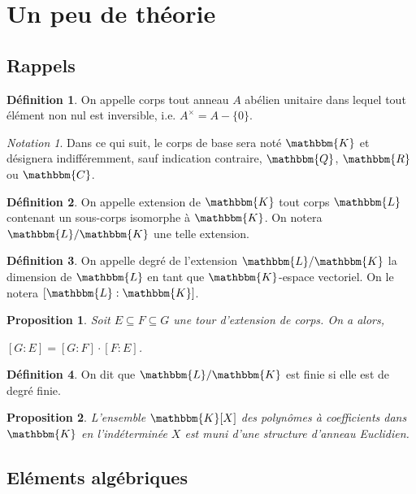 \documentclass[12pt]{article}
\newcommand{\jL}{\mathbbm{L}}
\newcommand{\Q}{\mathbbm{Q}}
\newcommand{\R}{\mathbbm{R}}
\newcommand{\C}{\mathbbm{C}}
\newcommand{\K}{\mathbbm{K}}
\newtheorem{prop}{Proposition}
\theoremstyle{definition}\newtheorem{defn}{Définition}
\theoremstyle{definition}\newtheorem{exm}{Exemple}
\theoremstyle{definition}\newtheorem{rem}{Remarque}
\theoremstyle{definition}\newtheorem{algo}{Algorithme}
\theoremstyle{remark}\newtheorem{exo}{Exercice}
\theoremstyle{remark}\newtheorem{nota}{Notation}
\begin{document}
\section{Un peu de théorie}


\subsection{Rappels}

\begin{defn}
On appelle corps tout anneau $A$ abélien unitaire dans lequel tout élément non nul est inversible, i.e. $A^{\times} = A  - \{0\}$.
\end{defn}

\begin{nota}
Dans ce qui suit, le corps de base sera noté $\K$ et désignera indifféremment, sauf indication contraire, $\Q$, $\R$ ou $\C$. 
\end{nota}

\begin{defn}
On appelle extension de $\K$ tout corps $\jL$ contenant un sous-corps isomorphe à $\K$. On notera $\jL / \K$ une telle extension.
\end{defn}

\begin{defn}
On appelle degré de l'extension $\jL / \K$ la dimension de $\jL$ en tant que $\K$-espace vectoriel. On le notera $[\jL : \K]$.
\end{defn}

\begin{prop}
Soit $E \subseteq F \subseteq G$ une tour d'extension de corps. On a alors, 
\begin{center}
$[G : E] = [G : F] \cdot [F : E]$.
\end{center}
\end{prop}

\begin{defn}
On dit que $\jL / \K$ est finie si elle est de degré finie.
\end{defn}

\begin{prop}
L'ensemble $\K[X]$ des polynômes à coefficients dans $\K$ en l'indéterminée $X$ est muni d'une structure d'anneau Euclidien.
\end{prop}


\subsection{Eléments algébriques}
\end{document}
